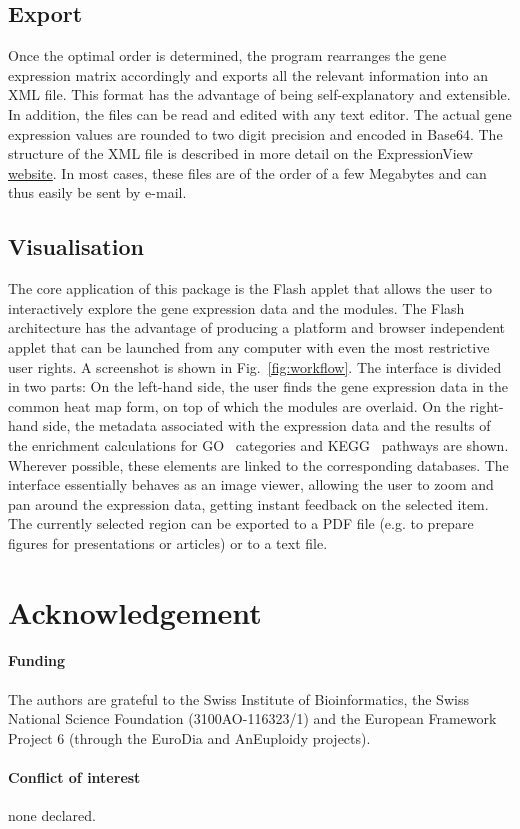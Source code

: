 \documentclass[round]{bioinfo}
\begin{document}
\subsection{Export}
Once the optimal order is determined, the program rearranges the gene
expression matrix accordingly and exports all the relevant information
into an XML file. This format has the advantage of being
self-explanatory and extensible. In addition, the files can be read
and edited with any text editor. The actual gene expression values are
rounded to two digit precision and encoded in Base64. The structure of
the XML file is described in more detail on the ExpressionView
\href{http://www.unil.ch/cbg/ExpressionView}{website}. In most cases,
these files are of the order of a few Megabytes and can thus easily be
sent by e-mail.

\subsection{Visualisation}
The core application of this package is the Flash applet that allows
the user to interactively explore the gene expression data and the
modules. The Flash architecture has the advantage of
producing a platform and browser independent applet that can be
launched from any computer with even the most restrictive user
rights. A screenshot is shown in Fig.~\ref{fig:workflow}. The
interface is divided in two parts: On the left-hand side, the user
finds the gene expression data in the common heat map form, on top of
which the modules are overlaid. On the right-hand side, the metadata
associated with the expression data and the results of the
enrichment calculations for GO~\citep{ashburner00} categories and
KEGG~\citep{kanehisa04} pathways are shown. Wherever possible, these elements
are linked to the corresponding databases. The interface essentially
behaves as an image viewer, allowing the user to zoom and pan around
the expression data, getting instant feedback on the selected
item. The currently selected region can be exported to a PDF file (e.g. 
to prepare figures for presentations or articles) or to a
text file.

\vspace*{-7pt}
\section*{Acknowledgement}

\paragraph{Funding\textcolon} The authors are grateful to the Swiss
Institute of Bioinformatics, the Swiss National Science Foundation
(3100AO-116323/1) and the European Framework Project 6 (through
the EuroDia and AnEuploidy projects).

\paragraph{Conflict of interest\textcolon} none declared.

\vspace*{-7pt}


\end{document}
